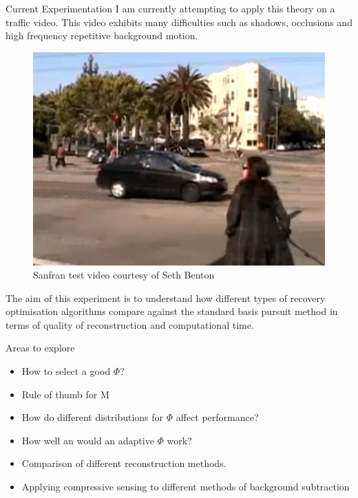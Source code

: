 \documentclass[final]{beamer}
\begin{document}
\begin{frame}{}
\begin{columns}[t]
   
    
    \begin{column}{0.24\textwidth}

      \begin{block}{Current Experimentation}
I am currently attempting to apply this theory on a traffic video. This video exhibits many difficulties such as shadows, occlusions and high frequency repetitive background motion. 
        \begin{figure}
          \centering
          \includegraphics[width=14cm]{trafficvideo}
\caption{Sanfran test video courtesy of Seth Benton}
        \end{figure}
The aim of this experiment is to understand how different types of recovery optimisation algorithms compare against the standard basis pursuit method in terms of quality of reconstruction and computational time.

      \end{block}

      \vspace{10pt}
      
      \begin{block}{Areas to explore}
        \begin{itemize}
        \item How to select a good $\Phi$? 
\item Rule of thumb for M
\item How do different distributions for $\Phi$ affect performance?
\item How well an would an adaptive $\Phi$ work?
\item Comparison of different reconstruction methods.
\item Applying compressive sensing to different methods of background subtraction
        \end{itemize}
      \end{block}


\end{column}
\end{columns}
\end{frame}
\end{document}
